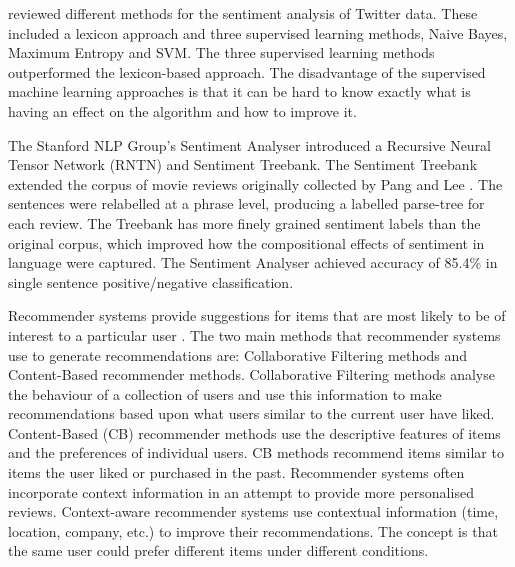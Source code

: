 \cite{Bhuta2014} reviewed different methods for the sentiment analysis of Twitter data. These included a lexicon approach and three supervised learning methods, Naive Bayes, Maximum Entropy and SVM. The three supervised learning methods outperformed the lexicon-based approach. The disadvantage of the supervised machine learning approaches is that it can be hard to know exactly what is having an effect on the algorithm and how to improve it.

The Stanford NLP Group's Sentiment Analyser \cite{stanfordSentiment2013} introduced a Recursive Neural Tensor Network (RNTN) and Sentiment Treebank. The Sentiment Treebank extended the corpus of movie reviews originally collected by Pang and Lee \cite{panglee2004}. The sentences were relabelled at a phrase level, producing a labelled parse-tree for each review. The Treebank has more finely grained sentiment labels than the original corpus, which improved how the compositional effects of sentiment in language were captured. The Sentiment Analyser achieved accuracy of 85.4\% in single sentence positive/negative classification.

Recommender systems provide suggestions for items that are most likely to be of interest to a particular user \cite{Ricci2015}. The two main methods that recommender systems use to generate recommendations are: Collaborative Filtering methods and Content-Based recommender methods. Collaborative Filtering methods analyse the behaviour of a collection of users and use this information to make recommendations based upon what users similar to the current user have liked. Content-Based (CB) recommender methods use the descriptive features of items and the preferences of individual users. CB methods recommend items similar to items the user liked or purchased in the past. Recommender systems often incorporate context information in an attempt to provide more personalised reviews. Context-aware recommender systems use contextual information (time, location, company, etc.) to improve their recommendations. The concept is that the same user could prefer different items under different conditions.

